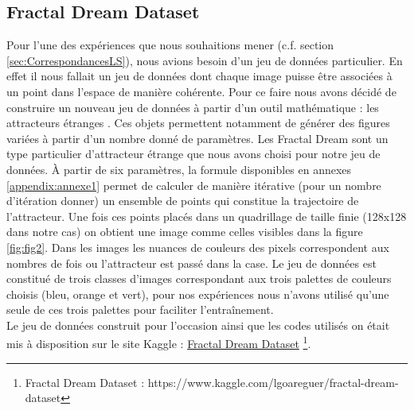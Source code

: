\documentclass[11pt,francais]{article}
\begin{document}
\subsection{Fractal Dream Dataset}
\label{sec:FDD}
Pour l'une des expériences que nous souhaitions mener (c.f. section \ref{sec:CorrespondancesLS}), nous avions besoin d'un jeu de données particulier. 
En effet il nous fallait un jeu de données dont chaque image puisse être associées à un point dans l'espace de manière cohérente. 
Pour ce faire nous avons décidé de construire un nouveau jeu de données à partir d'un outil mathématique : les attracteurs étranges \cite{Pickover}. Ces objets permettent notamment de générer des figures variées à partir d'un nombre donné de paramètres.
Les Fractal Dream \cite{Pickover} sont un type particulier d'attracteur étrange que nous avons choisi pour notre jeu de données. À partir de six paramètres, la formule disponibles en annexes \ref{appendix:annexe1} permet de calculer de manière itérative (pour un nombre d'itération donner) un ensemble de points qui constitue la trajectoire de l'attracteur. Une fois ces points placés dans un quadrillage de taille finie (128x128 dans notre cas) on obtient une image comme celles visibles dans la figure \ref{fig:fig2}. Dans les images les nuances de couleurs des pixels correspondent aux nombres de fois ou l'attracteur est passé dans la case. 
Le jeu de données est constitué de trois classes d'images correspondant aux trois palettes de couleurs choisis (bleu, orange et vert), pour nos expériences nous n'avons utilisé qu'une seule de ces trois palettes pour faciliter l'entraînement.\\
Le jeu de données construit pour l'occasion ainsi que les codes utilisés on était mis à disposition sur le site Kaggle : \href{https://www.kaggle.com/lgoareguer/fractal-dream-dataset}{Fractal Dream Dataset} \footnote{\label{note3}Fractal Dream Dataset : https://www.kaggle.com/lgoareguer/fractal-dream-dataset}.
\end{document}

